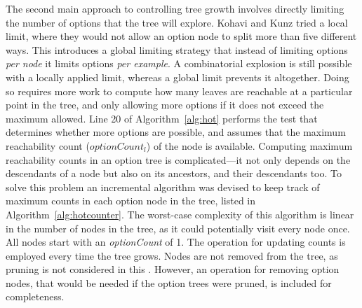 The second main approach to controlling tree growth involves directly limiting the number of options that the tree will explore. Kohavi and Kunz tried a local limit, where they would not allow an option node to split more than five different ways. This \thesis  introduces a global limiting strategy that instead of limiting options {\em per node} it limits options {\em per example}.  
A combinatorial explosion is still possible with a locally applied limit, whereas a global limit prevents it altogether.
Doing so requires more work to compute how many leaves are reachable at a particular point in the tree, and only allowing more options if it does not exceed the maximum allowed. Line 20 of Algorithm~\ref{alg:hot} performs the test that determines whether more options are possible, and assumes that the maximum reachability count ($optionCount_{l}$) of the node is available. Computing maximum reachability counts in an option tree is complicated---it not only depends on the descendants of a node but also on its ancestors, and their descendants too. To solve this problem an incremental algorithm was devised to keep track of maximum counts in each option node in the tree, listed in Algorithm~\ref{alg:hotcounter}. The worst-case complexity of this algorithm is linear in the number of nodes in the tree, as it could potentially visit every node once. All nodes start with an {\em optionCount} of 1. The operation for updating counts is employed every time the tree grows. 
Nodes are not removed from the tree, as pruning is not considered in this  \thesisc. However, an operation for removing option nodes, that would be needed if the option trees were pruned, is included for completeness.

